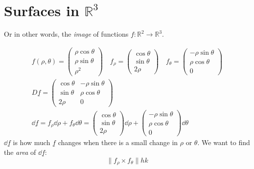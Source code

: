 \section{Surfaces in \texorpdfstring{$\mathbb{R}^3$}{R3}}
Or in other words, the \emph{image} of functions $f: \mathbb{R}^2\to
\mathbb{R}^3$.
\begin{example}[Paraboloid]
    \begin{gather*}
        f(\rho,\theta)=\begin{pmatrix}
            \rho\cos\theta\\\rho\sin\theta\\\rho^2
        \end{pmatrix} \quad
        f_{\rho}=\begin{pmatrix}
            \cos\theta\\\sin\theta\\ 2\rho
        \end{pmatrix} \quad f_{\theta}=\begin{pmatrix}
            -\rho\sin\theta\\\rho\cos\theta\\ 0
        \end{pmatrix} \\
        D \underline f = \begin{pmatrix}
            \cos\theta &-\rho\sin\theta \\
            \sin\theta &\rho\cos\theta \\
            2\rho & 0
        \end{pmatrix} \\
        \dd{\underline f} = f_{\rho}\dd{\rho} + f_{\theta}\dd{\theta} =
        \begin{pmatrix}
            \cos\theta\\\sin\theta\\ 2\rho
        \end{pmatrix}\dd{\rho} + \begin{pmatrix}
            -\rho\sin\theta \\ \rho\cos\theta\\ 0
        \end{pmatrix}\dd{\theta}
    \end{gather*}
    $\dd{\underline f}$ is how much $\underline f$ changes when there is a
    small change in $\rho$ or $\theta$. We want to find the \emph{area} of
    $\dd{\underline f}$:
    $$\|f_\rho\times f_\theta\|hk$$
\end{example}


